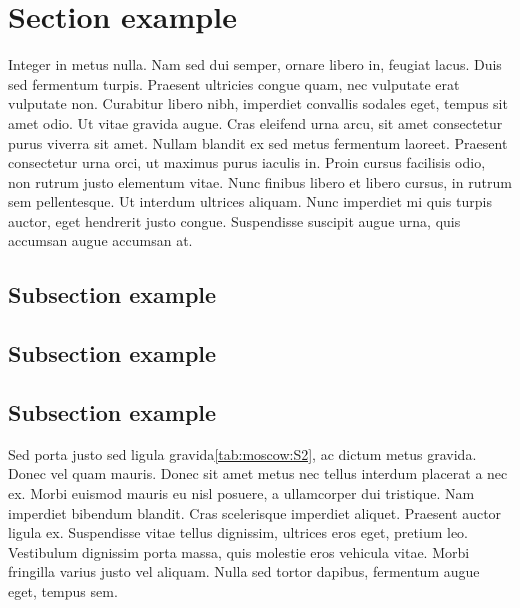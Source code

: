\section{Section example}

Integer in metus nulla. Nam sed dui semper, ornare libero in, feugiat lacus. Duis sed fermentum turpis. Praesent ultricies congue quam, nec vulputate erat vulputate non. Curabitur libero nibh, imperdiet convallis sodales eget, tempus sit amet odio. Ut vitae gravida augue. Cras eleifend urna arcu, sit amet consectetur purus viverra sit amet. Nullam blandit ex sed metus fermentum laoreet. Praesent consectetur urna orci, ut maximus purus iaculis in. Proin cursus facilisis odio, non rutrum justo elementum vitae. Nunc finibus libero et libero cursus, in rutrum sem pellentesque. Ut interdum ultrices aliquam. Nunc imperdiet mi quis turpis auctor, eget hendrerit justo congue. Suspendisse suscipit augue urna, quis accumsan augue accumsan at.

\subsection{Subsection example}

\subsection{Subsection example}

\subsection{Subsection example}

Sed porta justo sed ligula gravida\ref{tab:moscow:S2}, ac dictum metus gravida. Donec vel quam mauris. Donec sit amet metus nec tellus interdum placerat a nec ex. Morbi euismod mauris eu nisl posuere, a ullamcorper dui tristique. Nam imperdiet bibendum blandit. Cras scelerisque imperdiet aliquet. Praesent auctor ligula ex. Suspendisse vitae tellus dignissim, ultrices eros eget, pretium leo. Vestibulum dignissim porta massa, quis molestie eros vehicula vitae. Morbi fringilla varius justo vel aliquam. Nulla sed tortor dapibus, fermentum augue eget, tempus sem.


